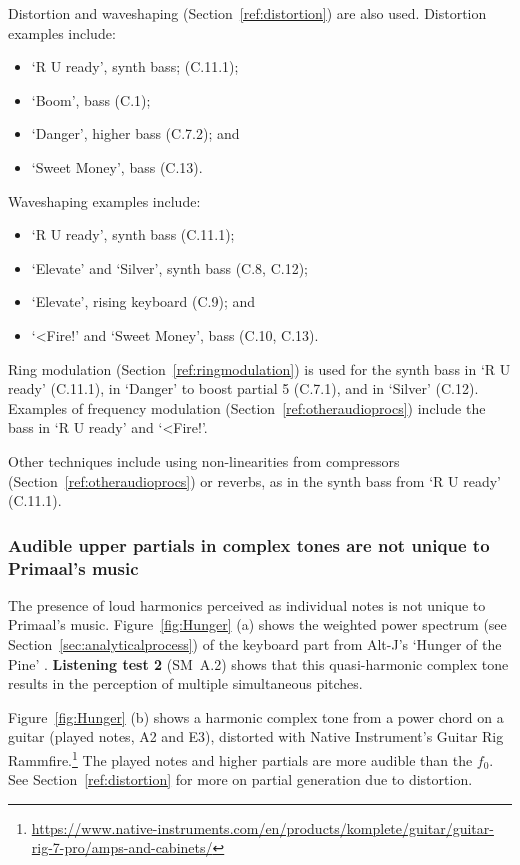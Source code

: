 \documentclass{article}
\begin{document}
Distortion and waveshaping (Section~\ref{ref:distortion}) are also used. Distortion examples include:
\begin{itemize}[noitemsep]
\item `R U ready', synth bass; (C.11.1); 
\item `Boom', bass (C.1); 
\item `Danger', higher bass (C.7.2); and
\item `Sweet Money', bass (C.13).
\end{itemize}

Waveshaping examples include:
\begin{itemize}[noitemsep]
\item `R U ready', synth bass (C.11.1);
\item `Elevate' and `Silver', synth bass (C.8, C.12);
\item `Elevate', rising keyboard (C.9); and
\item `<Fire!' and `Sweet Money', bass (C.10, C.13).
\end{itemize}

Ring modulation (Section~\ref{ref:ringmodulation}) is used for the synth bass in `R U ready' (C.11.1), in `Danger' to boost partial 5 (C.7.1), and in `Silver' (C.12). Examples of frequency modulation (Section~\ref{ref:otheraudioprocs}) include the bass in `R U ready' and `<Fire!'.

Other techniques include using non-linearities from compressors (Section~\ref{ref:otheraudioprocs}) or reverbs, as in the synth bass from `R U ready' (C.11.1).


\subsubsection{Audible upper partials in complex tones are not unique to Primaal's music}\label{sec:audiblepartialsothers}


The presence of loud harmonics perceived as individual notes is not unique to Primaal's music. Figure~\ref{fig:Hunger} (a) shows the weighted power spectrum (see Section~\ref{sec:analyticalprocess}) of the keyboard part from Alt-J's `Hunger of the Pine' \citep[4'30--end]{AltJ2014Hunger}. \textbf{Listening test 2} (SM~A.2) shows that this quasi-harmonic complex tone results in the perception of multiple simultaneous pitches.

Figure~\ref{fig:Hunger} (b) shows a harmonic complex tone from a power chord on a guitar (played notes, A2 and E3), distorted with Native Instrument's Guitar Rig Rammfire.\footnote{\url{https://www.native-instruments.com/en/products/komplete/guitar/guitar-rig-7-pro/amps-and-cabinets/}} The played notes and higher partials are more audible than the $f_0$. See Section~\ref{ref:distortion} for more on partial generation due to distortion.
\end{document}
